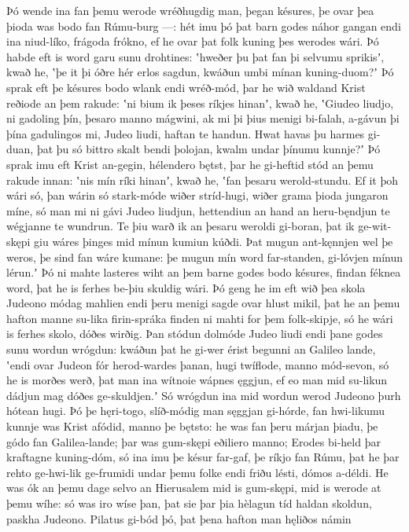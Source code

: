 Þó wende ina fan þemu werode wréðhugdig man,
þegan késures, þe ovar þea þioda was
bodo fan Rúmu-burg —: hét imu þó þat barn godes
náhor gangan endi ina niud-líko,
frágoda frókno, ef he ovar þat folk kuning
þes werodes wári. Þó habde eft is word garu
sunu drohtines: ʽhweðer þu þat fan þi selvumu sprikisʼ, kwað he,
ʽþe it þi óðre hér erlos sagdun,
kwáðun umbi mínan kuning-duom?ʼ Þó sprak eft þe késures bodo
wlank endi wréð-mód, þar he wið waldand Krist
reðiode an þem rakude: ʽni bium ik þeses ríkjes hinanʼ, kwað he,
ʽGiudeo liudjo, ni gadoling þín,
þesaro manno mágwini, ak mi þi þius menigi bi-falah,
a-gávun þi þína gadulingos mi, Judeo liudi,
haftan te handun. Hwat havas þu harmes gi-duan,
þat þu só bittro skalt bendi þolojan,
kwalm undar þínumu kunnje?ʼ Þó sprak imu eft Krist an-gegin,
hélendero bętst, þar he gi-heftid stód
an þemu rakude innan: ʽnis mín ríki hinanʼ, kwað he,
ʽfan þesaru werold-stundu. Ef it þoh wári só,
þan wárin só stark-móde wiðer stríd-hugi,
wiðer grama þioda jungaron míne,
só man mi ni gávi Judeo liudjun,
hettendiun an hand an heru-bęndjun
te wégjanne te wundrun. Te þiu warð ik an þesaru weroldi gi-boran,
þat ik ge-wit-skępi giu wáres þinges
mid mínun kumiun kúðdi. Þat mugun ant-kęnnjen wel
þe weros, þe sind fan wáre kumane: þe mugun mín word far-standen,
gi-lóvjen mínun lérun.ʼ Þó ni mahte lasteres wiht
an þem barne godes bodo késures,
findan féknea word, þat he is ferhes be-þiu
skuldig wári. Þó geng he im eft wið þea skola Judeono
módag mahlien endi þeru menigi sagde
ovar hlust mikil, þat he an þemu hafton manne
su-lika firin-spráka finden ni mahti
for þem folk-skipje, só he wári is ferhes skolo,
dóðes wirðig. Þan stódun dolmóde
Judeo liudi endi þane godes sunu
wordun wrógdun: kwáðun þat he gi-wer érist
begunni an Galileo lande, ʽendi ovar Judeon fór
herod-wardes þanan, hugi twíflode,
manno mód-sevon, só he is morðes werð,
þat man ina wítnoie wápnes ęggjun,
ef eo man mid su-likun dádjun mag dóðes ge-skuldjen.ʼ
Só wrógdun ina mid wordun werod Judeono
þurh hótean hugi. Þó þe hęri-togo,
slíð-módig man sęggjan gi-hórde,
fan hwi-likumu kunnje was Krist afódid,
manno þe bętsto: he was fan þeru márjan þiadu,
þe gódo fan Galilea-lande; þar was gum-skępi
eðiliero manno; Erodes bi-held þar
kraftagne kuning-dóm, só ina imu þe késur far-gaf,
þe ríkjo fan Rúmu, þat he þar rehto ge-hwi-lik
ge-frumidi undar þemu folke endi friðu lésti,
dómos a-déldi. He was ók an þemu dage selvo
an Hierusalem mid is gum-skępi,
mid is werode at þemu wíhe: só was iro wíse þan,
þat sie þar þia hèlagun tíd haldan skoldun,
paskha Judeono. Pilatus gi-bód þó,
þat þena hafton man hęliðos námin
